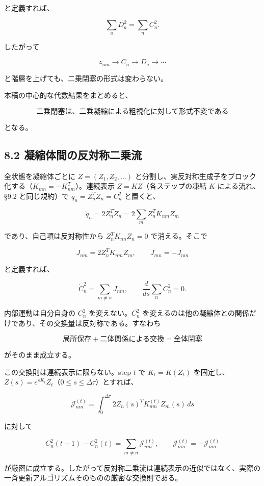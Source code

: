 \documentclass[
  a4paper,
]{ltjsarticle}
\begin{document}
と定義すれば、

\[
\sum_aD_a^2=\sum_nC_n^2.
\]

したがって

\[
z_{nm}\rightarrow C_n\rightarrow D_a\rightarrow\cdots
\]

と階層を上げても、二乗閉塞の形式は変わらない。

本稿の中心的な代数結果をまとめると、

\[
\boxed{
\text{二乗閉塞は、二乗凝縮による粗視化に対して形式不変である}
}
\]

となる。

\subsection{8.2
凝縮体間の反対称二乗流}\label{ux51ddux7e2eux4f53ux9593ux306eux53cdux5bfeux79f0ux4e8cux4e57ux6d41}

全状態を凝縮体ごとに \(Z=(Z_1,Z_2,\ldots)\)
と分割し、実反対称生成子をブロック化する（\(K_{mn}=-K_{nm}^T\)）。連続表示
\(\dot Z=KZ\)（各ステップの凍結 \(K\) による流れ、§9.2 と同じ規約）で
\(q_n=Z_n^TZ_n=C_n^2\) と置くと、

\[
\dot q_n
=
2Z_n^T\dot Z_n
=
2\sum_m Z_n^TK_{nm}Z_m
\]

であり、自己項は反対称性から \(Z_n^TK_{nn}Z_n=0\) で消える。そこで

\[
\boxed{J_{nm}=2Z_n^TK_{nm}Z_m},
\qquad
\boxed{J_{mn}=-J_{nm}}
\]

と定義すれば、

\[
\boxed{
\dot C_n^2
=
\sum_{m\ne n}J_{nm}
},
\qquad
\frac{d}{ds}\sum_nC_n^2=0.
\]

内部運動は自分自身の \(C_n^2\) を変えない。\(C_n^2\)
を変えるのは他の凝縮体との関係だけであり、その交換量は反対称である。すなわち

\[
\boxed{
\text{局所保存}
+
\text{二体関係による交換}
=
\text{全体閉塞}
}
\]

がそのまま成立する。

この交換則は連続表示に限らない。step \(t\) で \(K_t=K(Z_t)\)
を固定し、\(Z(s)=e^{sK_t}Z_t\)（\(0\le s\le\Delta\tau\)）とすれば、

\[
\mathcal J_{nm}^{(t)}
=
\int_0^{\Delta\tau}
2Z_n(s)^T K_{nm}^{(t)}Z_m(s)\,ds
\]

に対して

\[
\boxed{
C_n^2(t+1)-C_n^2(t)
=
\sum_{m\ne n}\mathcal J_{nm}^{(t)}
},
\qquad
\boxed{
\mathcal J_{mn}^{(t)}=-\mathcal J_{nm}^{(t)}
}
\]

が厳密に成立する。したがって反対称二乗流は連続表示の近似ではなく、実際の一斉更新アルゴリズムそのものの厳密な交換則である。
\end{document}
